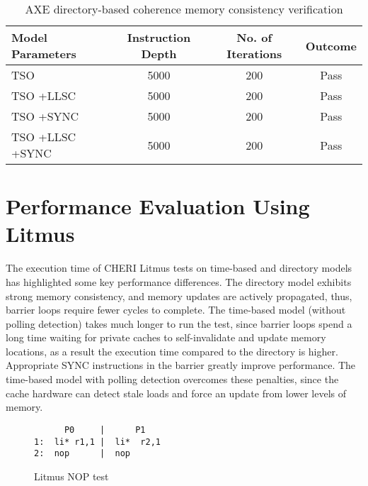 		\begin{table}[!h]	
		\begin{center}					
		\begin{tabular}{|l||c|c|c|}
			\hline
			Model Parameters & Instruction Depth & No. of Iterations & Outcome \\ 
			\hline 
			TSO & 5000 & 200 & Pass \\
			TSO +LLSC & 5000 & 200 & Pass \\
			TSO +SYNC & 5000 & 200 & Pass \\
			TSO +LLSC +SYNC & 5000 & 200 & Pass \\		
			\hline
		\end{tabular}
		\caption{AXE directory-based coherence memory consistency verification}
		\label{directory_regression}
		\end{center} 
		\end{table}
		\vspace{-10mm}

\section{Performance Evaluation Using Litmus}
		\label{litmus_perfromance}
		The execution time of CHERI Litmus tests on time-based and directory models has highlighted some key performance differences. The directory model exhibits strong memory consistency, and memory updates are actively propagated, thus, barrier loops require fewer cycles to complete. The time-based model (without polling detection) takes much longer to run the test, since barrier loops spend a long time waiting for private caches to self-invalidate and update memory locations, as a result the execution time compared to the directory is higher. Appropriate SYNC instructions in the barrier greatly improve performance. The time-based model with polling detection overcomes these penalties, since the cache hardware can detect stale loads and force an update from lower levels of memory.

\begin{figure}[t]
\begin{tcolorbox}[
colback=blue!1!white,
colframe=blue!65!black]
\begin{center}
\begin{BVerbatim}
      P0     |      P1 
1:  li* r1,1 |  li*  r2,1
2:  nop      |  nop 
\end{BVerbatim} 
\end{center}
\end{tcolorbox}
\caption{Litmus NOP test}
\label{nop_litmus}
\end{figure}

